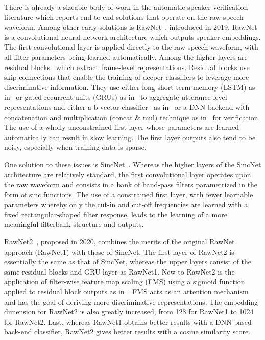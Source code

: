 \documentclass{article}
\begin{document}
There is already a sizeable body of work in the automatic speaker verification literature which reports end-to-end solutions that operate on the raw speech waveform. Among other early solutions is RawNet~\cite{jung2019rawnet}, introduced in 2019. RawNet is a convolutional neural network architecture which outputs speaker embeddings. The first convolutional layer is applied directly to the raw speech waveform, with all filter parameters being learned automatically. Among the higher layers are residual blocks~\cite{he2016deep} which extract frame-level representations. Residual blocks use skip connections that enable the training of deeper classifiers to leverage more discriminative information. They use either long short-term memory (LSTM) as in~\cite{jung2018complete} or gated recurrent units (GRUs) as in~\cite{jung2019rawnet} to aggregate utterance-level representations and either a b-vector classifier~\cite{lee2014speaker} as in~\cite{jung2018complete} or a DNN backend with concatenation and multiplication (concat $\&$ mul) technique as in~\cite{jung2019rawnet} for verification. The use of a wholly unconstrained first layer whose parameters are learned automatically can result in slow learning. The first layer outputs also tend to be noisy, especially when training data is sparse.

One solution to these issues is SincNet~\cite{ravanelli2018speaker,ravanelli2018learning}. Whereas the higher layers of the SincNet architecture are relatively standard, the first convolutional layer operates upon the raw waveform and consists in a bank of band-pass filters parametrized in the form of sinc functions. The use of a constrained first layer, with fewer learnable parameters whereby only the cut-in and cut-off frequencies are learned with a fixed rectangular-shaped filter response, leads to the learning of a more meaningful filterbank structure and outputs. 

RawNet2~\cite{jung2020improved}, proposed in 2020, combines the merits of the original RawNet approach (RawNet1) with those of SincNet. The first layer of RawNet2 is essentially the same as that of SincNet, whereas the upper layers consist of the same residual blocks and GRU layer as RawNet1. New to RawNet2 is the application of filter-wise feature map scaling (FMS) using a sigmoid function applied to residual block outputs as in~\cite{woo2018cbam}. FMS acts as an attention mechanism and has the goal of deriving more discriminative representations. The embedding dimension for RawNet2 is also greatly increased, from 128 for RawNet1 to 1024 for RawNet2.
Last, whereas RawNet1 obtains better results with a DNN-based back-end classifier, RawNet2 gives better results with a cosine similarity score.
\end{document}
